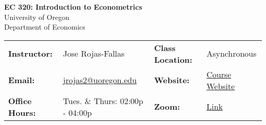 \begin{center}
\textbf{\huge EC 320: Introduction to Econometrics}\\ 
\vspace{0.1in}
University of Oregon\\ 
Department of Economics\\ 
\end{center}
\vspace{-.2in}
\begin{center}\begin{tabular}{llll}
\toprule
    \textbf{Instructor:} & \footnotesize{Jose Rojas-Fallas} & \textbf{Class Location:}  & {\footnotesize Asynchronous} \\ 
    \textbf{Email:} & \footnotesize{\href{mailto:jrojas2@uoregon.edu}{jrojas2@uoregon.edu}} & 
    \textbf{Website:} & \footnotesize{\hyperlink{https://jrojas1003.github.io/EC-320-Intro-Econometrics/}{Course Website}} \\
    \textbf{Office Hours:} & \footnotesize{Tues. \& Thurs: 02:00p - 04:00p} & 
    \textbf{Zoom:} & \footnotesize{\hyperlink{https://uoregon.zoom.us/j/98965994279}{Link}} \\
\bottomrule
\end{tabular}
\end{center}